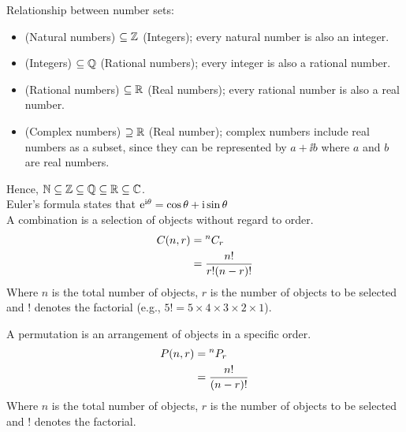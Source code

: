 \documentclass[a4paper,11pt,twoside]{article}
\begin{document}
\begin{center}
    \begin{minipage}{0.7\textwidth}
        Relationship between number sets:
        \begin{itemize}
          \item \N{} (Natural numbers) $\subseteq \mathbb{Z}$ (Integers); every natural number is also an integer.
          \item \Z{} (Integers) $\subseteq \mathbb{Q}$ (Rational numbers); every integer is also a rational number.
          \item \Q{} (Rational numbers) $\subseteq \mathbb{R}$ (Real numbers); every rational number is also a real number.
          \item \Complex{} (Complex numbers) $\supseteq \mathbb{R}$ (Real number); complex numbers include real numbers as a subset, since they can be represented by $a+\ii b$ where $a$ and $b$ are real numbers.
        \end{itemize}
        Hence, $\mathbb{N}\subseteq\mathbb{Z}\subseteq\mathbb{Q}\subseteq\mathbb{R}\subseteq\mathbb{C}$.\\[0.5cm]

        Euler's formula states that $\mathrm{e}^{\mathrm{i}\theta} = \cos\theta + \mathrm{i}\sin\theta$\\[0.5cm]

        A combination is a selection of objects without regard to order.
    	\begin{align}
        	C(n,r) &= {}^{n}C_{r}\\
        	&= \frac{n!}{r!(n-r)!}
        \end{align}
        Where $n$ is the total number of objects, $r$ is the number of objects to be selected and $!$ denotes the factorial (e.g., $5! = 5\times4\times3\times2\times1$).

        A permutation is an arrangement of objects in a specific order.
        \begin{align}
        	P(n,r) &= {}^{n}P_{r}\\
        	&= \frac{n!}{(n-r)!}
        \end{align}
        Where $n$ is the total number of objects, $r$ is the number of objects to be selected and $!$ denotes the factorial.
    \end{minipage}
\end{center}
\end{document}
